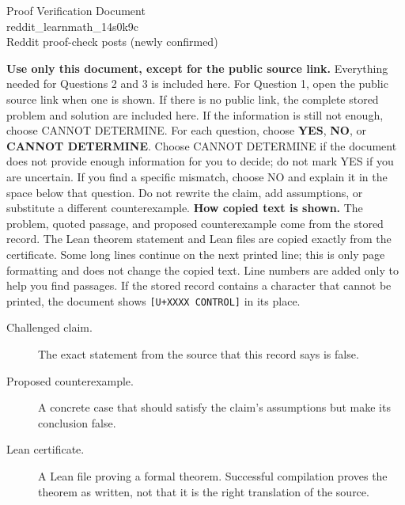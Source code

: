\documentclass[11pt]{article}
\begin{document}
\begin{center}{\LARGE Proof Verification Document}\\[2pt]{\large reddit\_learnmath\_14s0k9c}\\[2pt]{\small Reddit proof-check posts (newly confirmed)}\end{center}
\begin{center}\end{center}
\textbf{Use only this document, except for the public source link.} Everything needed for Questions 2 and 3 is included here. For Question 1, open the public source link when one is shown. If there is no public link, the complete stored problem and solution are included here. If the information is still not enough, choose CANNOT DETERMINE.
For each question, choose \textbf{YES}, \textbf{NO}, or \textbf{CANNOT DETERMINE}. Choose CANNOT DETERMINE if the document does not provide enough information for you to decide; do not mark YES if you are uncertain. If you find a specific mismatch, choose NO and explain it in the space below that question. Do not rewrite the claim, add assumptions, or substitute a different counterexample.
\textbf{How copied text is shown.} The problem, quoted passage, and proposed counterexample come from the stored record. The Lean theorem statement and Lean files are copied exactly from the certificate. Some long lines continue on the next printed line; this is only page formatting and does not change the copied text. Line numbers are added only to help you find passages. If the stored record contains a character that cannot be printed, the document shows \texttt{[U+XXXX CONTROL]} in its place.
\begin{description}
\item[Challenged claim.] The exact statement from the source that this record says is false.
\item[Proposed counterexample.] A concrete case that should satisfy the claim's assumptions but make its conclusion false.
\item[Lean certificate.] A Lean file proving a formal theorem. Successful compilation proves the theorem as written, not that it is the right translation of the source.
\end{description}
\end{document}

